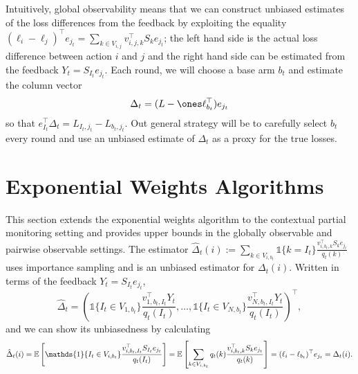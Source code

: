 \documentclass{article}
\begin{document}
Intuitively, global observability means that we can construct unbiased estimates of the loss differences from the feedback by exploiting the equality $(\ell_i-\ell_j)^\top e_{j_t} = \sum_{k\in V_{i,j}}  v_{i,j,k}^\top S_k e_{j_t}$; the left hand side is the actual loss difference between action $i$ and $j$ and the right hand side can be estimated from the feedback $Y_t = S_{I_t}e_{j_t}$. Each round, we will choose a base arm $b_t$ and estimate the column vector
\begin{equation}
  \Delta_t = (L - \ones \ell_{b_t}^\top) e_{j_t}
\end{equation}
so that $ e_{I_t}^\top \Delta_t = L_{I_t,j_t} - L_{b_t,j_t}$. Out general strategy will be to carefully select $b_t$ every round and use an unbiased estimate of $\Delta_t$ as a proxy for the true losses. 


\section{Exponential Weights Algorithms}
\label{sec:ew}
This section extends the exponential weights algorithm to the contextual partial monitoring setting and provides upper bounds in the globally observable and pairwise observable settings.
The estimator $\hat\Delta_t(i) := \sum_{k\in V_{i,b_t}} \mathds{1}\{k = I_t\}\frac{ v_{i,b_t,k}^\top S_k e_{j_t}}{q_t(k)}$ uses importance sampling and is an unbiased estimator for $\Delta_t(i)$. 
Written in terms of the feedback $Y_t = S_{I_t}e_{j_t}$,
\begin{equation}\label{eqn:hat.Delta}
  \hat\Delta_t = \left(
    \mathds{1}\{I_t\in V_{1,b_t} \}\frac{ v_{1,b_t,I_t}^\top Y_t}{q_t(I_t)},
    \ldots,
    \mathds{1}\{I_t\in V_{N,b_t} \}\frac{ v_{N,b_t,I_t}^\top Y_t}{q_t(I_t)}
  \right)^\top,
\end{equation}
and we can show its unbiasedness by calculating
\[
  \hat\Delta_t(i)=
  \ex\left[   \mathds{1}\{I_t\in V_{i,b_t} \}\frac{ v_{i,b_t,I_t}^\top S_{I_t}e_{j_t}}{q_t(I_t)}\right]
  =
  \ex\left [\sum_{k \in V_{i,b_t}} q_t(k) \frac{ v_{i,b_t,k}^\top S_{k}e_{j_t}}{q_t(k)}\right]
  =(\ell_i - \ell_{b_t})^\top e_{j_t}
  =
  \Delta_t(i).
  \]
\end{document}
